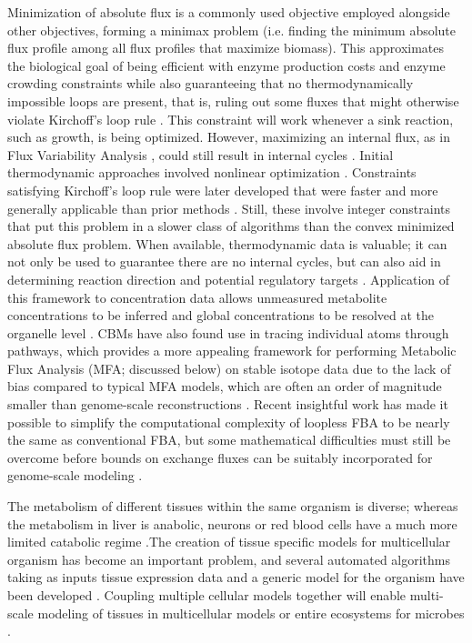 \documentclass[phd,tocprelim,draft]{cornell}
\newcommand{\citep}[1]{\cite{#1}}
\begin{document}
Minimization of absolute flux is a commonly used objective employed
alongside other objectives, forming a minimax problem (i.e. finding
the minimum absolute flux profile among all flux profiles that
maximize biomass). This approximates the biological goal of being
efficient with enzyme production costs and enzyme crowding constraints
while also guaranteeing that no thermodynamically impossible loops are
present, that is, ruling out some fluxes that might otherwise violate
Kirchoff’s loop rule \citep{Smallbone2009a, Schellenberger2011}.  This
constraint will work whenever a sink reaction, such as growth, is
being optimized.  However, maximizing an internal flux, as in Flux
Variability Analysis \citep{Orth2010}, could still result in internal
cycles \citep{Schellenberger2011}. Initial thermodynamic approaches
involved nonlinear optimization \citep{Beard2002, Henry2006,
Henry2007, Kummel2006}. Constraints satisfying Kirchoff’s loop rule
were later developed that were faster and more generally applicable
than prior methods \citep{Schellenberger2011, Muller2013}.  Still,
these involve integer constraints that put this problem in a slower
class of algorithms than the convex minimized absolute flux problem.
When available, thermodynamic data is valuable; it can not only be
used to guarantee there are no internal cycles, but can also aid in
determining reaction direction and potential regulatory targets
\citep{Schellenberger2011, Henry2006, Haraldsdottir2012,
DeMartino2012}. Application of this framework to concentration data
allows unmeasured metabolite concentrations to be inferred and global
concentrations to be resolved at the organelle level
\citep{Kummel2006}. CBMs have also found use in tracing individual
atoms through pathways, which provides a more appealing framework for
performing Metabolic Flux Analysis (MFA; discussed below) on stable
isotope data due to the lack of bias compared to typical MFA models,
which are often an order of magnitude smaller than genome-scale
reconstructions \citep{Ravikirthi2011}.  Recent insightful work has
made it possible to simplify the computational complexity of loopless
FBA to be nearly the same as conventional FBA, but some mathematical
difficulties must still be overcome before bounds on exchange fluxes
can be suitably incorporated for genome-scale modeling
\citep{Fleming2012, Warren2007}.


The metabolism of different tissues within the same organism is
diverse; whereas the metabolism in liver is anabolic, neurons or red
blood cells have a much more limited catabolic regime
\citep{Lewis2010, Jamshidi2006, Wang2012}.The creation of tissue
specific models for multicellular organism has become an important
problem, and several automated algorithms taking as inputs tissue
expression data and a generic model for the organism have been
developed \citep{Wang2012, Becker2008, Shlomi2008}. Coupling multiple
cellular models together will enable multi-scale modeling of tissues
in multicellular models or entire ecosystems for microbes
\citep{Lewis2010, Sun2012, Bordbar2010, Klitgord2011}.
\end{document}
